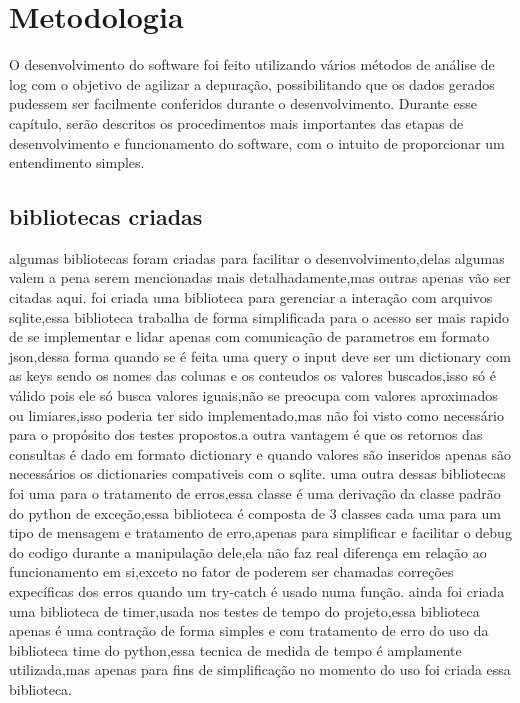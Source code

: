 \documentclass[
	12pt,				%
	openright,			%
	oneside,			%
	a4paper,			%
	english,			%
	french,				%
	spanish,			%
	brazil,				%
	]{abntex2}
\begin{document}
\chapter{Metodologia}
\label{ch: materiais e métodos}

O desenvolvimento do software foi feito utilizando vários métodos de análise de log com o objetivo de agilizar a depuração, possibilitando que os dados gerados pudessem ser facilmente conferidos durante o desenvolvimento.\newline
Durante esse capítulo, serão descritos os procedimentos mais importantes das etapas de desenvolvimento e funcionamento do software, com o intuito de proporcionar um entendimento simples.\newline

\section{bibliotecas criadas}
\label{sec:bibliotecas criadas}
algumas bibliotecas foram criadas para facilitar o desenvolvimento,delas algumas valem a pena serem mencionadas mais detalhadamente,mas outras apenas vão ser citadas aqui.
foi criada uma biblioteca para gerenciar a interação com arquivos sqlite,essa biblioteca trabalha de forma simplificada para o acesso ser mais rapido de se implementar e lidar apenas com comunicação de parametros em formato json,dessa forma quando se é feita uma query o input deve ser um dictionary com as keys sendo os nomes das colunas e os conteudos os valores buscados,isso só é válido pois ele só busca valores iguais,não se preocupa com valores aproximados ou limiares,isso poderia ter sido implementado,mas não foi visto como necessário para o propósito dos testes propostos.a outra vantagem é que os retornos das consultas é dado em formato dictionary e quando valores são inseridos apenas são necessários os dictionaries compativeis com o sqlite.
uma outra dessas bibliotecas foi uma para o tratamento de erros,essa classe é uma derivação da classe padrão do python de exceção,essa biblioteca é composta de 3 classes cada uma para um tipo de mensagem e tratamento de erro,apenas para simplificar e facilitar o debug do codigo durante a manipulação dele,ela não faz real diferença em relação ao funcionamento em si,exceto no fator de poderem ser chamadas correções expecíficas dos erros quando um try-catch é usado numa função.
ainda foi criada uma biblioteca de timer,usada nos testes de tempo do projeto,essa biblioteca apenas é uma contração de forma simples e com tratamento de erro do uso da biblioteca time do python,essa tecnica de medida de tempo é amplamente utilizada,mas apenas para fins de simplificação no momento do uso foi criada essa biblioteca.
\end{document}
